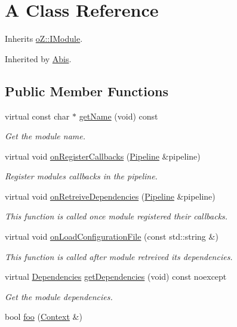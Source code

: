 \hypertarget{class_a}{}\section{A Class Reference}
\label{class_a}


Inherits \mbox{\hyperlink{classo_z_1_1_i_module}{o\+Z\+::\+I\+Module}}.



Inherited by \mbox{\hyperlink{class_abis}{Abis}}.

\subsection*{Public Member Functions}
\begin{DoxyCompactItemize}
\item 
virtual const char $\ast$ \mbox{\hyperlink{class_a_a2d19f0df2a97d6c3ad2c763f9134af82}{get\+Name}} (void) const
\begin{DoxyCompactList}\small\item\em Get the module name. \end{DoxyCompactList}\item 
virtual void \mbox{\hyperlink{class_a_ac82f8db798576ee2eff8b6b91b77c239}{on\+Register\+Callbacks}} (\mbox{\hyperlink{classo_z_1_1_pipeline}{Pipeline}} \&pipeline)
\begin{DoxyCompactList}\small\item\em Register module\textquotesingle{}s callbacks in the pipeline. \end{DoxyCompactList}\item 
virtual void \mbox{\hyperlink{class_a_a968473c1dcccfee5502df74229fb263b}{on\+Retreive\+Dependencies}} (\mbox{\hyperlink{classo_z_1_1_pipeline}{Pipeline}} \&pipeline)
\begin{DoxyCompactList}\small\item\em This function is called once module registered their callbacks. \end{DoxyCompactList}\item 
virtual void \mbox{\hyperlink{class_a_aa096a581a39df500ec97e2d48c24fbef}{on\+Load\+Configuration\+File}} (const std\+::string \&)
\begin{DoxyCompactList}\small\item\em This function is called after module retreived its dependencies. \end{DoxyCompactList}\item 
virtual \mbox{\hyperlink{classo_z_1_1_i_module_ac13210556cb2a65d186bfbe5208c666c}{Dependencies}} \mbox{\hyperlink{class_a_a2220cafae67f880a553d6219dfcf8581}{get\+Dependencies}} (void) const noexcept
\begin{DoxyCompactList}\small\item\em Get the module dependencies. \end{DoxyCompactList}\item 
bool \mbox{\hyperlink{class_a_a7cda350ed54b9810f6e1bfdb6c7189d6}{foo}} (\mbox{\hyperlink{classo_z_1_1_context}{Context}} \&)
\end{DoxyCompactItemize}
